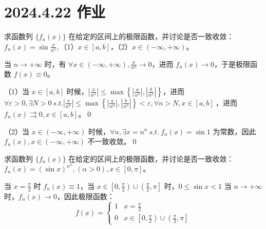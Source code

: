 \ifx\allfiles\undefined

\date{}
\author{尹锦润}

\maketitle
\fi

\section{2024.4.22 作业}
\begin{ques}
	求函数列 $\displaystyle \{f_{n}( x)\}$ 在给定的区间上的极限函数，并讨论是否一致收敛：$\displaystyle f_{n}( x) =\sin\frac{x}{n^{n}} ,$（1）$\displaystyle x\in [ a,b]$，（2）$\displaystyle x\in ( -\infty ,+\infty )$。
\end{ques}



当 $\displaystyle n\rightarrow +\infty $ 时，有 $\displaystyle \forall x\in ( -\infty ,+\infty ) ,\frac{x}{n^{n}}\rightarrow 0$，进而 $\displaystyle f_{n}( x)\rightarrow 0$，于是极限函数 $\displaystyle f( x) \equiv 0$。

（1）当 $\displaystyle x\in [ a,b]$ 时候，$\displaystyle \left| \frac{x}{n^{n}}\right| \leqslant \max\left\{\left| \frac{a}{n^{n}}\right| ,\left| \frac{b}{n^{n}}\right| \right\}$，进而 $\displaystyle \forall \varepsilon  >0,\exists N >0\ s.t.\left| \frac{x}{n^{n}}\right| \leqslant \max\left\{\left| \frac{a}{n^{n}}\right| ,\left| \frac{b}{n^{n}}\right| \right\} < \varepsilon ,\forall n >N,x\in [ a,b] \ $，进而 $\displaystyle f_{n}( x) \rightrightarrows 0,x\in [ a,b]$。\qed 

（2）当 $\displaystyle x\in ( -\infty ,+\infty )$ 时候，$\displaystyle \forall n,\exists x=n^{n} \ s.t.\ f_{n}( x) =\sin 1$ 为常数，因此 $\displaystyle f_{n}( x) ,x\in ( -\infty ,+\infty )$ 不一致收敛。\qed 



\begin{ques}
	求函数列 $\displaystyle \{f_{n}( x)\}$ 在给定的区间上的极限函数，并讨论是否一致收敛：$\displaystyle f_{n}( x) =(\sin x)^{n^{\alpha }} ,( \alpha  >0) ,x\in [ 0,\pi ]$。
\end{ques}



当 $\displaystyle x=\frac{\pi }{2}$ 时 $\displaystyle f_{n}( x) \equiv 1$，当 $\displaystyle x\in \left[ 0,\frac{\pi }{2}\right) \cup \left(\frac{\pi }{2} ,\pi \right]$ 时，$\displaystyle 0\leqslant \sin x< 1$ 当 $\displaystyle n\rightarrow +\infty $ 时，$\displaystyle f_{n}( x)\rightarrow 0$，因此极限函数：
\begin{equation*}
	f( x) =\begin{cases}
		1 & x=\frac{\pi }{2}\\
		0 & x\in \left[ 0,\frac{\pi }{2}\right) \cup \left(\frac{\pi }{2} ,\pi \right]
	\end{cases}
\end{equation*}



